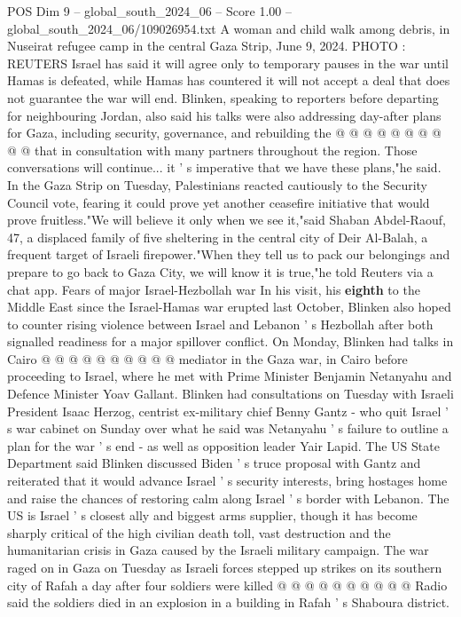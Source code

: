 \begin{textsample}{POS Dim 9 – global\_south\_2024\_06 – Score 1.00 – global\_south\_2024\_06/109026954.txt}
A woman and child walk among debris, in Nuseirat refugee camp in the central Gaza Strip, June 9, 2024.
PHOTO : REUTERS Israel has said it will agree only to temporary pauses in the war until Hamas is defeated, while Hamas has countered it will not accept a deal that does not guarantee the war will end.
Blinken, speaking to reporters before departing for neighbouring Jordan, also said his talks were also addressing day-after plans for Gaza, including security, governance, and rebuilding the @ @ @ @ @ @ @ @ @ @ that in consultation with many partners throughout the region.
Those conversations will continue... it ' s imperative that we have these plans,"he said.
In the Gaza Strip on Tuesday, Palestinians reacted cautiously to the Security Council vote, fearing it could prove yet another ceasefire initiative that would prove fruitless."We will believe it only when we see it,"said Shaban Abdel-Raouf, 47, a displaced family of five sheltering in the central city of Deir Al-Balah, a frequent target of Israeli firepower."When they tell us to pack our belongings and prepare to go back to Gaza City, we will know it is true,"he told Reuters via a chat app.
Fears of major Israel-Hezbollah war In his visit, his \textbf{eighth} to the Middle East since the Israel-Hamas war erupted last October, Blinken also hoped to counter rising violence between Israel and Lebanon ' s Hezbollah after both signalled readiness for a major spillover conflict.
On Monday, Blinken had talks in Cairo @ @ @ @ @ @ @ @ @ @ mediator in the Gaza war, in Cairo before proceeding to Israel, where he met with Prime Minister Benjamin Netanyahu and Defence Minister Yoav Gallant.
Blinken had consultations on Tuesday with Israeli President Isaac Herzog, centrist ex-military chief Benny Gantz - who quit Israel ' s war cabinet on Sunday over what he said was Netanyahu ' s failure to outline a plan for the war ' s end - as well as opposition leader Yair Lapid.
The US State Department said Blinken discussed Biden ' s truce proposal with Gantz and reiterated that it would advance Israel ' s security interests, bring hostages home and raise the chances of restoring calm along Israel ' s border with Lebanon.
The US is Israel ' s closest ally and biggest arms supplier, though it has become sharply critical of the high civilian death toll, vast destruction and the humanitarian crisis in Gaza caused by the Israeli military campaign.
The war raged on in Gaza on Tuesday as Israeli forces stepped up strikes on its southern city of Rafah a day after four soldiers were killed @ @ @ @ @ @ @ @ @ @ Radio said the soldiers died in an explosion in a building in Rafah ' s Shaboura district.

\end{textsample}
